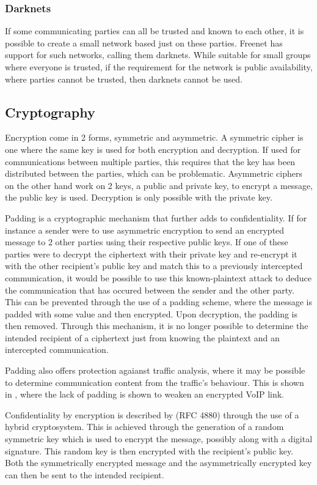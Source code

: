 		\subsubsection*{Darknets}
			If some communicating parties can all be trusted and known to each other, it is possible to create a small network based just on these parties. Freenet has support for such networks, calling them darknets. While suitable for small groups where everyone is trusted, if the requirement for the network is public availability, where parties cannot be trusted, then darknets cannot be used.
	\subsection{Cryptography}
		Encryption come in 2 forms, symmetric and asymmetric. A symmetric cipher is one where the same key is used for both encryption and decryption. If used for communications between multiple parties, this requires that the key has been distributed between the parties, which can be problematic. Asymmetric ciphers on the other hand work on 2 keys, a public and private key, to encrypt a message, the public key is used. Decryption is only possible with the private key. \cite{appliedcrypto}
		
		Padding is a cryptographic mechanism that further adds to confidentiality. If for instance a sender were to use asymmetric encryption to send an encrypted message to 2 other parties using their respective public keys. If one of these parties were to decrypt the ciphertext with their private key and re-encrypt it with the other recipient's public key and match this to a previously intercepted communication, it would be possible to use this known-plaintext attack to deduce the communication that has occured between the sender and the other party. This can be prevented through the use of a padding scheme, where the message is padded with some value and then encrypted. Upon decryption, the padding is then removed. Through this mechanism, it is no longer possible to determine the intended recipient of a ciphertext just from knowing the plaintext and an intercepted communication.
		
		Padding also offers protection agaianst traffic analysis, where it may be possible to determine communication content from the traffic's behaviour. This is shown in \cite{Wright:2010:USP:1880022.1880029}, where the lack of padding is shown to weaken an encrypted VoIP link.
	
		Confidentiality by encryption is described by (RFC 4880)  through the use of a hybrid cryptosystem. This is achieved through the generation of a random symmetric key which is used to encrypt the message, possibly along with a digital signature. This random key is then encrypted with the recipient's public key. Both the symmetrically encrypted message and the asymmetrically encrypted key can then be sent to the intended recipient.
